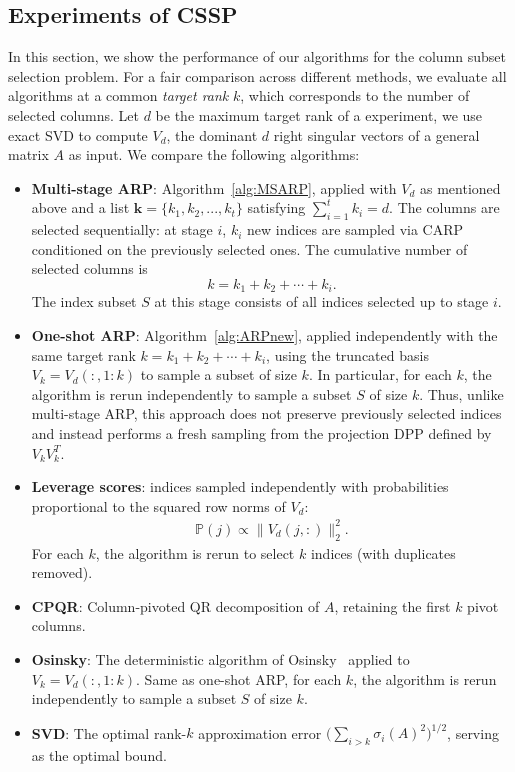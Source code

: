 \documentclass[11pt]{article}
\newcommand{\be}{\begin{eqnarray}}
\newcommand{\ee}{\end{eqnarray}}
\newcommand{\<}{\langle}
\renewcommand{\>}{\rangle}
\begin{document}
\subsection{Experiments of CSSP}
In this section, we show the performance of our algorithms for the column subset selection problem. For a fair comparison across different methods, we evaluate all algorithms at a common \emph{target rank} $k$, which corresponds to the number of selected columns. Let $d$ be the maximum target rank of a experiment, we use exact SVD to compute $V_d$, the dominant $d$ right singular vectors of a general matrix $A$ as input. We compare the following algorithms:
\begin{itemize}
    \item \textbf{Multi-stage ARP}: Algorithm~\ref{alg:MSARP}, applied with $V_{d}$ as mentioned above and a list $\mathbf{k} = \{k_1,k_2,...,k_t\}$ satisfying $\sum_{i=1}^t k_i = d$. The columns are selected sequentially: at stage $i$, $k_i$ new indices are sampled via CARP conditioned on the previously selected ones. The cumulative number of selected columns is
\[
k = k_1 + k_2 + \cdots + k_i.
\]
The index subset $S$ at this stage consists of all indices selected up to stage $i$.

    \item \textbf{One-shot ARP}: Algorithm~\ref{alg:ARPnew}, applied independently with the same target rank $k = k_1 + k_2 + \cdots + k_i$, using the truncated basis $V_k = V_d(:,1:k)$ to sample a subset of size $k$. In particular, for each $k$, the algorithm is rerun independently to sample a subset $S$ of size $k$. Thus, unlike multi-stage ARP, this approach does not preserve previously selected indices and instead performs a fresh sampling from the projection DPP defined by $V_k V_k^T$.

    \item \textbf{Leverage scores}: indices sampled independently with probabilities proportional to the squared row norms of $V_d$:
    \be
    \mathbb{P}(j) \propto \|V_d(j,:)\|_2^2.
    \ee
    For each $k$, the algorithm is rerun to select $k$ indices (with duplicates removed). 

    \item \textbf{CPQR}: Column-pivoted QR decomposition of $A$, retaining the first $k$ pivot columns.

    \item \textbf{Osinsky}: The deterministic algorithm of Osinsky~\cite{OSINSKY2025359} applied to $V_{k} = V_d(:,1:k)$. Same as one-shot ARP, for each $k$, the algorithm is rerun independently to sample a subset $S$ of size $k$.

    \item \textbf{SVD}: The optimal rank-$k$ approximation error $\bigl(\sum\limits_{i>k} \sigma_i(A)^2\bigr)^{1/2}$, serving as the optimal bound.
\end{itemize}
\end{document}

